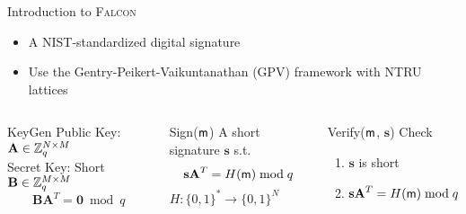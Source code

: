 \begin{frame}{Introduction to \textsc{Falcon}}

\begin{itemize}
    \item A NIST-standardized digital signature
    \item Use the Gentry-Peikert-Vaikuntanathan (GPV) framework \cite{STOC:GenPeiVai08} with NTRU lattices
\end{itemize}
\medskip
\begin{columns}[T]

\begin{block}{KeyGen}
Public Key: $\mathbf{A} \in \mathbb{Z}^{N \times M}_q$\\
Secret Key: Short $\mathbf{B} \in \mathbb{Z}_q^{M \times M}$
\vskip -10pt
\[ \mathbf{BA}^T = \mathbf{0} \bmod q \]
\end{block}

\begin{block}{Sign(${\sf m}$)}
A short signature $\mathbf{s}$ s.t.
\vskip -22pt
\[ \mathbf{sA}^T = H({\sf m}) \bmod q \]
\vskip -8pt
$H:\{0,1\}^* \to \{0,1\}^N$
\end{block}

\begin{block}{Verify(${\sf m}$, $\mathbf{s}$)}
Check
\begin{enumerate}
    \item $\mathbf{s}$ is short
    \item $\mathbf{sA}^T = H({\sf m}) \bmod q$
\end{enumerate}
\end{block}

\end{columns}
    
\end{frame}


